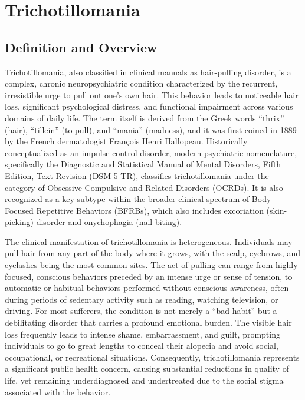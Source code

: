\chapter{Trichotillomania}

\section*{Definition and Overview}
Trichotillomania, also classified in clinical manuals as hair-pulling disorder, is a complex, chronic neuropsychiatric condition characterized by the recurrent, irresistible urge to pull out one's own hair. This behavior leads to noticeable hair loss, significant psychological distress, and functional impairment across various domains of daily life. The term itself is derived from the Greek words ``thrix'' (hair), ``tillein'' (to pull), and ``mania'' (madness), and it was first coined in 1889 by the French dermatologist Fran\c{c}ois Henri Hallopeau. Historically conceptualized as an impulse control disorder, modern psychiatric nomenclature, specifically the Diagnostic and Statistical Manual of Mental Disorders, Fifth Edition, Text Revision (DSM-5-TR), classifies trichotillomania under the category of Obsessive-Compulsive and Related Disorders (OCRDs). It is also recognized as a key subtype within the broader clinical spectrum of Body-Focused Repetitive Behaviors (BFRBs), which also includes excoriation (skin-picking) disorder and onychophagia (nail-biting).

The clinical manifestation of trichotillomania is heterogeneous. Individuals may pull hair from any part of the body where it grows, with the scalp, eyebrows, and eyelashes being the most common sites. The act of pulling can range from highly focused, conscious behaviors preceded by an intense urge or sense of tension, to automatic or habitual behaviors performed without conscious awareness, often during periods of sedentary activity such as reading, watching television, or driving. For most sufferers, the condition is not merely a ``bad habit'' but a debilitating disorder that carries a profound emotional burden. The visible hair loss frequently leads to intense shame, embarrassment, and guilt, prompting individuals to go to great lengths to conceal their alopecia and avoid social, occupational, or recreational situations. Consequently, trichotillomania represents a significant public health concern, causing substantial reductions in quality of life, yet remaining underdiagnosed and undertreated due to the social stigma associated with the behavior.

